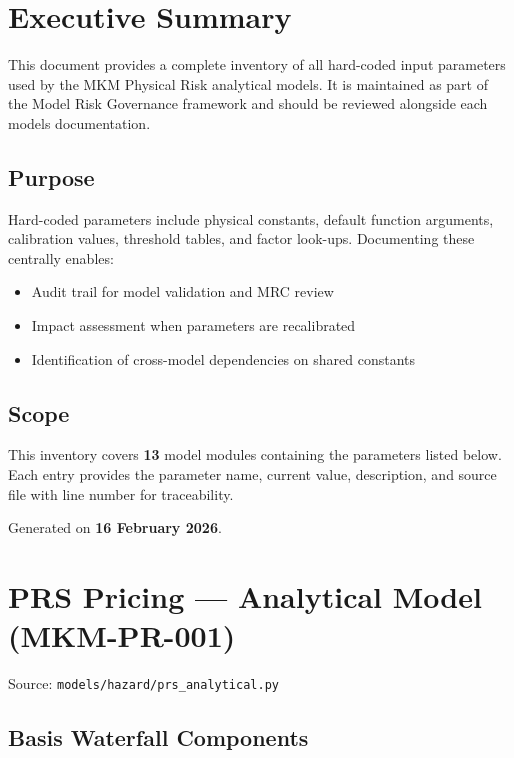 \documentclass[11pt,a4paper]{article}
\begin{document}
\mkmtitlepage
\mkmlegalpage
\tableofcontents
\clearpage

\section{Executive Summary}

This document provides a complete inventory of all hard-coded input parameters used by the MKM Physical Risk analytical models. It is maintained as part of the Model Risk Governance framework and should be reviewed alongside each model\textquotesingle s documentation.

\subsection{Purpose}
Hard-coded parameters include physical constants, default function arguments, calibration values, threshold tables, and factor look-ups. Documenting these centrally enables:
\begin{itemize}
    \item Audit trail for model validation and MRC review
    \item Impact assessment when parameters are recalibrated
    \item Identification of cross-model dependencies on shared constants
\end{itemize}

\subsection{Scope}
This inventory covers \textbf{13} model modules containing the parameters listed below. Each entry provides the parameter name, current value, description, and source file with line number for traceability.

Generated on \textbf{16 February 2026}.
\clearpage

\section{PRS Pricing --- Analytical Model (MKM-PR-001)}

Source: \texttt{models/hazard/prs\_analytical.py}

\subsection{Basis Waterfall Components}
\end{document}
